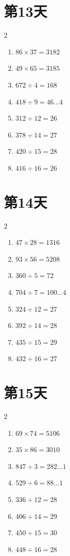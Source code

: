 \documentclass[12pt]{ctexart}
\begin{document}
	\section*{第13天}
	\begin{multicols}{2}
		\begin{enumerate}[itemsep=0pt]
			\item $86 \times 37 = 3182$
			\item $49 \times 65 = 3185$
			\item $672 \div 4 = 168$
			\item $418 \div 9 = 46\ldots 4$
			\item $312 \div 12 = 26$
			\item $378 \div 14 = 27$
			\item $420 \div 15 = 28$
			\item $416 \div 16 = 26$
		\end{enumerate}
	\end{multicols}
	
	\section*{第14天}
	\begin{multicols}{2}
		\begin{enumerate}[itemsep=0pt]
			\item $47 \times 28 = 1316$
			\item $93 \times 56 = 5208$
			\item $360 \div 5 = 72$
			\item $704 \div 7 = 100\ldots 4$
			\item $324 \div 12 = 27$
			\item $392 \div 14 = 28$
			\item $435 \div 15 = 29$
			\item $432 \div 16 = 27$
		\end{enumerate}
	\end{multicols}
	
	\section*{第15天}
	\begin{multicols}{2}
		\begin{enumerate}[itemsep=0pt]
			\item $69 \times 74 = 5106$
			\item $35 \times 86 = 3010$
			\item $847 \div 3 = 282\ldots 1$
			\item $529 \div 6 = 88\ldots 1$
			\item $336 \div 12 = 28$
			\item $406 \div 14 = 29$
			\item $450 \div 15 = 30$
			\item $448 \div 16 = 28$
		\end{enumerate}
	\end{multicols}
	
\end{document}
